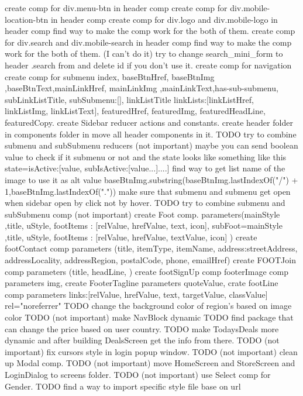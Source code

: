  create comp for div.menu-btn in header comp 
create comp for div.mobile-location-btn in header comp
 create comp for div.logo and div.mobile-logo in header comp
    find way to make the comp work for the both of them.
 create comp for div.search and div.mobile-search in header comp
    find way to make the comp work for the both of them. (I can't do it)
 try to change search_mini_form to header .search from and delete id if you don't use it.
 create comp for navigation 
 create comp for submenu 
   {
      index, baseBtnHref, baseBtnImg ,baseBtnText,mainLinkHref, mainLinkImg ,mainLinkText,has-sub-submenu, subLinkListTitle, subSubmenu:[{}], linkListTitle linkLists:[{linkListHref, linkListImg, linkListText}], featuredHref, featuredImg, featuredHeadLine, featuredCopy.
   }
 create Sidebar reducer actions and constants.
create header folder in components folder in move all header components in it.
TODO try to combine submenu and subSubmenu reducers (not important)
   maybe you can send boolean value to check if it submenu or not and the state looks like something like this 
      state={isActive:[{value, subIsActive:[value...]}....]}
 find way to get list name of the image to use it as alt value
   baseBtnImg.substring(baseBtnImg.lastIndexOf("/") + 1,baseBtnImg.lastIndexOf("."))
  make sure that submenu and submenu get open when sidebar open by click not by hover.
TODO try to combine submenu and subSubmenu comp (not important)
 create Foot comp.
   parameters(mainStyle ,title, uStyle, footItems : [{relValue, hrefValue, text, icon}], subFoot={mainStyle ,title, uStyle, footItems : [{relValue, hrefValue, textValue, icon}]} )
create footContact comp
   parameters (title, itemType, itemName, address:{streetAddress, addressLocality, addressRegion, postalCode}, phone, emailHref)
 create FOOTJoin comp
   parameters (title, headLine, )
 create footSignUp comp
 footerImage comp
   parameters img,
 create FooterTagline 
   parameters quoteValue,
 crate footLine comp
   parameters links:[{relValue, hrefValue, text, targetValue, classValue}] rel="noreferrer"
TODO change the background color of region's based on image color
TODO (not important) make NavBlock dynamic  
TODO find package that can change the price based on user country.
TODO make TodaysDeals more dynamic and after building DealsScreen get the info from there.
TODO (not important) fix cursors style in login popup window.
TODO (not important) clean up Modal comp.
TODO (not important) move HomeScreen and StoreScreen and LoginDialog to screens folder.
TODO (not important) use Select comp for Gender.
TODO find a way to import specific style file base on url
